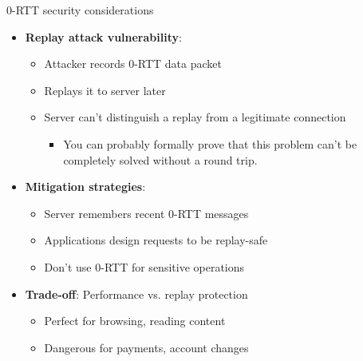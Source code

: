 \ifdefined\PRESENTATION\else\PassOptionsToClass{handout}{beamer}\fi\documentclass[aspectratio=169, lualatex]{beamer}
\begin{document}
\begin{frame}{0-RTT security considerations}
	\begin{itemize}
		\item \textbf{Replay attack vulnerability}:
		      \begin{itemize}
			      \item Attacker records 0-RTT data packet
			      \item Replays it to server later
			      \item Server can't distinguish a replay from a legitimate connection
			            \begin{itemize}
				            \item You can probably formally prove that this problem can't be completely solved without a round trip.
			            \end{itemize}
		      \end{itemize}
		\item \textbf{Mitigation strategies}:
		      \begin{itemize}
			      \item Server remembers recent 0-RTT messages
			      \item Applications design requests to be replay-safe
			      \item Don't use 0-RTT for sensitive operations
		      \end{itemize}
		\item \textbf{Trade-off}: Performance vs. replay protection
		      \begin{itemize}
			      \item Perfect for browsing, reading content
			      \item Dangerous for payments, account changes
		      \end{itemize}
	\end{itemize}
\end{frame}
\end{document}

